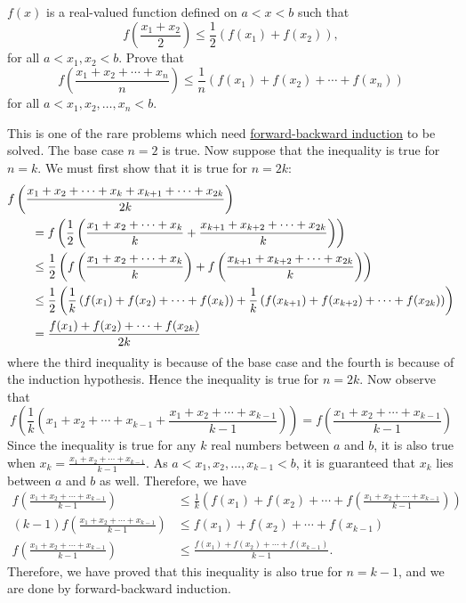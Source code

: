 \begin{question}
    $f(x)$ is a real-valued function defined on $a < x < b$ such that 
    \[f\left( \frac{x_{1} + x_{2}}{2} \right) \leq \frac{1}{2}(f(x_{1}) + f(x_{2})),\] 
    for all $a < x_{1}, x_{2} < b$. Prove that 
    \[f\left(\frac{x_{1} + x_{2} + \cdots + x_{n}}{n}\right)\leq \frac{1}{n}(f(x_{1}) + f(x_{2}) + \cdots + f(x_{n}))\] 
    for all $a < x_{1}, x_{2}, \ldots, x_{n} < b$.
\end{question}
\begin{solution}
    This is one of the rare problems which need \hyperref[teq:
    f.b.induction]{forward-backward induction} to be solved. The base case $n
    = 2$ is true. Now suppose that the inequality is true for $n = k$. We must
    first show that it is true for $n = 2k$:
    \begin{align*}
        \MoveEqLeft
    f\left( \frac{x_1 + x_2 + \cdots + x_k + x_{k + 1} + \cdots + x_{2k}}{2k} \right)\\
        &= f\left( \frac{1}{2} \left( \dfrac{x_1 + x_2 + \cdots + x_k}{k} + \dfrac{x_{k + 1} + x_{k + 2} + \cdots + x_{2k}}{k} \right) \right)\\
        &\leq \frac{1}{2}\left( f\left( \frac{x_1 + x_2 + \cdots + x_k}{k} \right) + f\left( \frac{x_{k + 1} + x_{k + 2} + \cdots + x_{2k}}{k} \right) \right) \\
        &\leq \frac{1}{2} \left( \frac{1}{k} \left( f(x_1) + f(x_2) + \cdots + f(x_k) \right) + \frac{1}{k} \left( f(x_{k + 1}) + f(x_{k + 2}) + \cdots + f(x_{2k}) \right) \right) \\
        &= \frac{f(x_1) + f(x_2) + \cdots + f(x_{2k})}{2k}
    \end{align*}
    where the third inequality is because of the base case and the fourth is
    because of the induction hypothesis. Hence the inequality is true for $n =
    2k$. Now observe that
    \[
        f \left( \frac{1}{k} \left( x_1 + x_2 + \cdots + x_{k - 1} + \frac{x_1 + x_2 + \cdots + x_{k - 1}}{k - 1} \right) \right) = f \left( \frac{x_1 + x_2 + \cdots + x_{k - 1}}{k - 1} \right)
    \]
    Since the inequality is true for any $k$ real numbers between $a$ and $b$,
    it is also true when $x_k = \frac{x_1 + x_2 + \cdots + x_{k - 1}}{k - 1}$.
    As $a < x_1, x_2, \ldots, x_{k - 1} < b$, it is guaranteed that $x_k$ lies
    between $a$ and $b$ as well.
    Therefore, we have
    \begin{align*}
        f \left( \frac{x_1 + x_2 + \cdots + x_{k - 1}}{k - 1} \right) &\leq \frac{1}{k} \left( f(x_1) + f(x_2) + \cdots + f\left( \frac{x_1 + x_2 + \cdots + x_{k - 1}}{k - 1} \right) \right)\\
        (k - 1) f \left( \frac{x_1 + x_2 + \cdots + x_{k - 1}}{k - 1} \right) &\leq f(x_1) + f(x_2) + \cdots + f(x_{k - 1})\\
        f \left( \frac{x_1 + x_2 + \cdots + x_{k - 1}}{k - 1} \right) &\leq \frac{f(x_1) + f(x_2) + \cdots + f(x_{k - 1})}{k - 1}.
    \end{align*}
    Therefore, we have proved that this inequality is also true for $n = k -
    1$, and we are done by forward-backward induction.
\end{solution}

